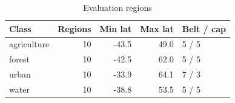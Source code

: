 \begin{table}[t]
\centering
\caption{Evaluation regions}
\label{tab:benchmark_scenes}
\begin{tabular}{lrrrl}
\toprule
Class & Regions & Min lat & Max lat & Belt / cap \\
\midrule
agriculture & 10 & -43.5 & 49.0 & 5 / 5 \\
forest & 10 & -42.5 & 62.0 & 5 / 5 \\
urban & 10 & -33.9 & 64.1 & 7 / 3 \\
water & 10 & -38.8 & 53.5 & 5 / 5 \\
\bottomrule
\end{tabular}
\end{table}
